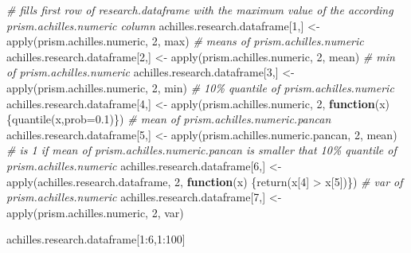 \documentclass[
]{article}
\newenvironment{Shaded}{\begin{snugshade}}{\end{snugshade}}
\newcommand{\AttributeTok}[1]{\textcolor[rgb]{0.77,0.63,0.00}{#1}}
\newcommand{\CommentTok}[1]{\textcolor[rgb]{0.56,0.35,0.01}{\textit{#1}}}
\newcommand{\ControlFlowTok}[1]{\textcolor[rgb]{0.13,0.29,0.53}{\textbf{#1}}}
\newcommand{\DecValTok}[1]{\textcolor[rgb]{0.00,0.00,0.81}{#1}}
\newcommand{\FloatTok}[1]{\textcolor[rgb]{0.00,0.00,0.81}{#1}}
\newcommand{\FunctionTok}[1]{\textcolor[rgb]{0.00,0.00,0.00}{#1}}
\newcommand{\NormalTok}[1]{#1}
\newcommand{\OtherTok}[1]{\textcolor[rgb]{0.56,0.35,0.01}{#1}}
\newcommand{\SpecialCharTok}[1]{\textcolor[rgb]{0.00,0.00,0.00}{#1}}
\begin{document}
\begin{Shaded}
\begin{Highlighting}[]
\CommentTok{\# fills first row of research.dataframe with the maximum value of the according prism.achilles.numeric column}
\NormalTok{achilles.research.dataframe[}\DecValTok{1}\NormalTok{,] }\OtherTok{\textless{}{-}} \FunctionTok{apply}\NormalTok{(prism.achilles.numeric, }\DecValTok{2}\NormalTok{, max)}
\CommentTok{\# means of prism.achilles.numeric}
\NormalTok{achilles.research.dataframe[}\DecValTok{2}\NormalTok{,] }\OtherTok{\textless{}{-}} \FunctionTok{apply}\NormalTok{(prism.achilles.numeric, }\DecValTok{2}\NormalTok{, mean)}
\CommentTok{\# min of prism.achilles.numeric}
\NormalTok{achilles.research.dataframe[}\DecValTok{3}\NormalTok{,] }\OtherTok{\textless{}{-}} \FunctionTok{apply}\NormalTok{(prism.achilles.numeric, }\DecValTok{2}\NormalTok{, min)}
\CommentTok{\# 10\% quantile of prism.achilles.numeric}
\NormalTok{achilles.research.dataframe[}\DecValTok{4}\NormalTok{,] }\OtherTok{\textless{}{-}} \FunctionTok{apply}\NormalTok{(prism.achilles.numeric, }\DecValTok{2}\NormalTok{, }\ControlFlowTok{function}\NormalTok{(x)\{}\FunctionTok{quantile}\NormalTok{(x,}\AttributeTok{prob=}\FloatTok{0.1}\NormalTok{)\})}
\CommentTok{\# mean of prism.achilles.numeric.pancan}
\NormalTok{achilles.research.dataframe[}\DecValTok{5}\NormalTok{,] }\OtherTok{\textless{}{-}} \FunctionTok{apply}\NormalTok{(prism.achilles.numeric.pancan, }\DecValTok{2}\NormalTok{, mean)}
\CommentTok{\# is 1 if mean of prism.achilles.numeric.pancan is smaller that 10\% quantile of prism.achilles.numeric}
\NormalTok{achilles.research.dataframe[}\DecValTok{6}\NormalTok{,] }\OtherTok{\textless{}{-}} \FunctionTok{apply}\NormalTok{(achilles.research.dataframe, }\DecValTok{2}\NormalTok{, }\ControlFlowTok{function}\NormalTok{(x) \{}\FunctionTok{return}\NormalTok{(x[}\DecValTok{4}\NormalTok{] }\SpecialCharTok{\textgreater{}}\NormalTok{ x[}\DecValTok{5}\NormalTok{])\})}
\CommentTok{\# var of prism.achilles.numeric}
\NormalTok{achilles.research.dataframe[}\DecValTok{7}\NormalTok{,] }\OtherTok{\textless{}{-}} \FunctionTok{apply}\NormalTok{(prism.achilles.numeric, }\DecValTok{2}\NormalTok{, var)}
\end{Highlighting}
\end{Shaded}

\begin{Shaded}
\begin{Highlighting}[]
\NormalTok{achilles.research.dataframe[}\DecValTok{1}\SpecialCharTok{:}\DecValTok{6}\NormalTok{,}\DecValTok{1}\SpecialCharTok{:}\DecValTok{100}\NormalTok{]}
\end{Highlighting}
\end{Shaded}
\end{document}
